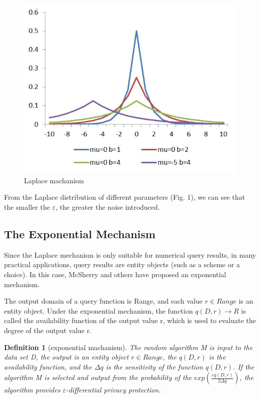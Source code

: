 \documentclass[10pt,conference]{IEEEtran}
\newtheorem{definition}{Definition}
\begin{document}
\begin{figure}[h]
    \centering
    \includegraphics[scale=0.6]{laplace.png}
    \caption{Laplace machanism}
    \label{fig:figere}
\end{figure}

From the Laplace distribution of different parameters (Fig. 1), we can see that the smaller the $\varepsilon$, the greater the noise introduced.


\subsection{The Exponential Mechanism}

Since the Laplace mechanism is only suitable for numerical query results, in many practical applications, query results are entity objects (such as a scheme or a choice). In this case, McSherry and others have proposed an exponential mechanism.

The output domain of a query function is Range, and each value $r\in Range$ is an entity object. Under the exponential mechanism, the function $q(D,r)\rightarrow R$ is called the availability function of the output value r, which is used to evaluate the degree of the output value r.

\begin{definition}[exponential machanism\cite{Mcsherry2007Mechanism}]
The random algorithm M is input to the data set D, the output is an entity object $r\in Range$, the $q(D,r)$ is the availability function, and the $\Delta q$ is the sensitivity of the function $q(D,r)$. If the algorithm M is selected and output from the probability of the $exp(\frac{\varepsilon q(D,r) }{2\Delta q})$, the algorithm provides $\varepsilon$-differential privacy protection.
\end{definition}
\end{document}
